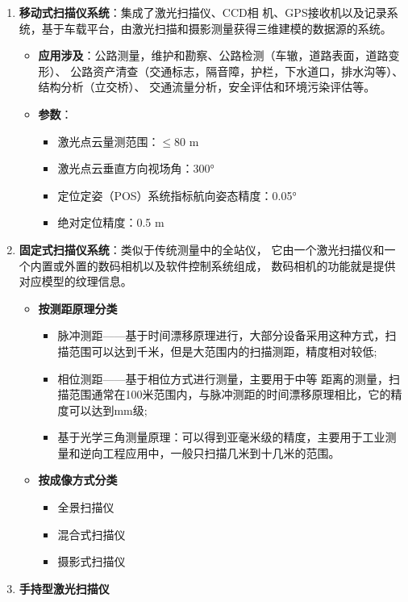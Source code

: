 \begin{enumerate}
	\item {\bfseries\kaishu 移动式扫描仪系统}：集成了激光扫描仪、CCD相
		机、GPS接收机以及记录系统，基于车载平台，由激光扫描和摄影测量获得三维建模的数据源的系统。
		\begin{itemize}
			\item \textbf{应用涉及}：公路测量，维护和勘察、公路检测（车辙，道路表面，道路变形）、
				公路资产清查（交通标志，隔音障，护栏，下水道口，排水沟等）、结构分析（立交桥）、
				交通流量分析，安全评估和环境污染评估等。
			\item \textbf{参数}：
				\begin{itemize}
					\item 激光点云量测范围：$ \leqslant $80 m
					\item 激光点云垂直方向视场角：300°
					\item 定位定姿（POS）系统指标航向姿态精度：0.05°
					\item 绝对定位精度：0.5 m
				\end{itemize}
		\end{itemize}
	\item {\bfseries\kaishu 固定式扫描仪系统}：类似于传统测量中的全站仪，
		它由一个激光扫描仪和一个内置或外置的数码相机以及软件控制系统组成，
		数码相机的功能就是提供对应模型的纹理信息。
		\begin{itemize}
			\item \textbf{按测距原理分类}
				\begin{itemize}
					\item 脉冲测距——基于时间漂移原理进行，大部分设备采用这种方式，扫描范围可以达到千米，但是大范围内的扫描测距，精度相对较低;
					\item 相位测距——基于相位方式进行测量，主要用于中等 距离的测量，扫描范围通常在100米范围内，与脉冲测距的时间漂移原理相比，它的精度可以达到mm级;
					\item 基于光学三角测量原理：可以得到亚毫米级的精度，主要用于工业测量和逆向工程应用中，一般只扫描几米到十几米的范围。
				\end{itemize}
			\item \textbf{按成像方式分类}
				\begin{itemize}
					\item 全景扫描仪
					\item 混合式扫描仪
					\item 摄影式扫描仪
				\end{itemize}
		\end{itemize}
	\item {\bfseries\kaishu 手持型激光扫描仪}
\end{enumerate}

